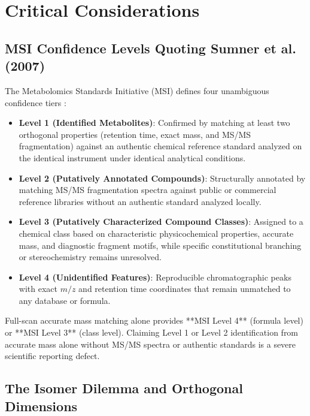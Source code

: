 \documentclass[11pt,twoside,openright]{book}
\begin{document}
\section{Critical Considerations}

\subsection{MSI Confidence Levels Quoting Sumner et al. (2007)}

The Metabolomics Standards Initiative (MSI) defines four unambiguous confidence tiers \cite{sumner2007proposed, schymanski2014identifying, broadhurst2018guidelines, wang2016sharing}:
\begin{itemize}
    \item \textbf{Level 1 (Identified Metabolites)}: Confirmed by matching at least two orthogonal properties (retention time, exact mass, and MS/MS fragmentation) against an authentic chemical reference standard analyzed on the identical instrument under identical analytical conditions.
    \item \textbf{Level 2 (Putatively Annotated Compounds)}: Structurally annotated by matching MS/MS fragmentation spectra against public or commercial reference libraries without an authentic standard analyzed locally.
    \item \textbf{Level 3 (Putatively Characterized Compound Classes)}: Assigned to a chemical class based on characteristic physicochemical properties, accurate mass, and diagnostic fragment motifs, while specific constitutional branching or stereochemistry remains unresolved.
    \item \textbf{Level 4 (Unidentified Features)}: Reproducible chromatographic peaks with exact $m/z$ and retention time coordinates that remain unmatched to any database or formula.
\end{itemize}

Full-scan accurate mass matching alone provides **MSI Level 4** (formula level) or **MSI Level 3** (class level). Claiming Level 1 or Level 2 identification from accurate mass alone without MS/MS spectra or authentic standards is a severe scientific reporting defect.

\subsection{The Isomer Dilemma and Orthogonal Dimensions}
\end{document}
